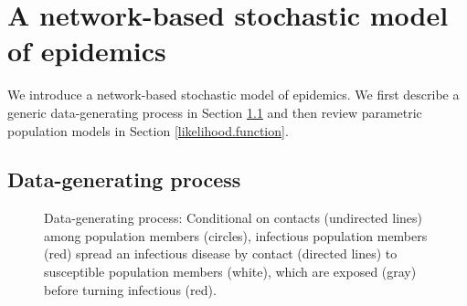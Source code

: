 \documentclass[12pt,usenatbib,referee]{article}
\begin{document}
\section{A network-based stochastic model of epidemics}
\label{parametric}

We introduce a network-based stochastic model of epidemics.
We first describe a generic data-generating process in Section \ref{sec:data.generating.process} and then review parametric population models in Section \ref{likelihood.function}.

\subsection{Data-generating process}
\label{sec:data.generating.process}

\begin{figure}[t]
\center
\caption{\label{data.generating.process}Data-generating process: 
Conditional on contacts (undirected lines) among population members (circles), 
infectious population members (red) spread an infectious disease by contact (directed lines) to susceptible population members (white), which are exposed (gray) before turning infectious (red).}\s
{}
\scalebox{0.5}{
}
\end{figure}
\end{document}
